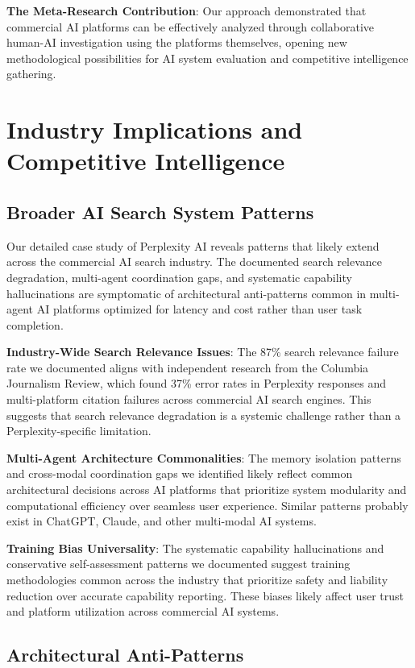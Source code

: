 \documentclass[12pt]{article}
\begin{document}
\textbf{The Meta-Research Contribution}: Our approach demonstrated that commercial AI platforms can be effectively analyzed through collaborative human-AI investigation using the platforms themselves, opening new methodological possibilities for AI system evaluation and competitive intelligence gathering.


\section{Industry Implications and Competitive Intelligence}

\subsection{Broader AI Search System Patterns}

Our detailed case study of Perplexity AI reveals patterns that likely extend across the commercial AI search industry. The documented search relevance degradation, multi-agent coordination gaps, and systematic capability hallucinations are symptomatic of architectural anti-patterns common in multi-agent AI platforms optimized for latency and cost rather than user task completion.

\textbf{Industry-Wide Search Relevance Issues}: The 87\% search relevance failure rate we documented aligns with independent research from the Columbia Journalism Review, which found 37\% error rates in Perplexity responses and multi-platform citation failures across commercial AI search engines. This suggests that search relevance degradation is a systemic challenge rather than a Perplexity-specific limitation.

\textbf{Multi-Agent Architecture Commonalities}: The memory isolation patterns and cross-modal coordination gaps we identified likely reflect common architectural decisions across AI platforms that prioritize system modularity and computational efficiency over seamless user experience. Similar patterns probably exist in ChatGPT, Claude, and other multi-modal AI systems.

\textbf{Training Bias Universality}: The systematic capability hallucinations and conservative self-assessment patterns we documented suggest training methodologies common across the industry that prioritize safety and liability reduction over accurate capability reporting. These biases likely affect user trust and platform utilization across commercial AI systems.

\subsection{Architectural Anti-Patterns}
\end{document}

